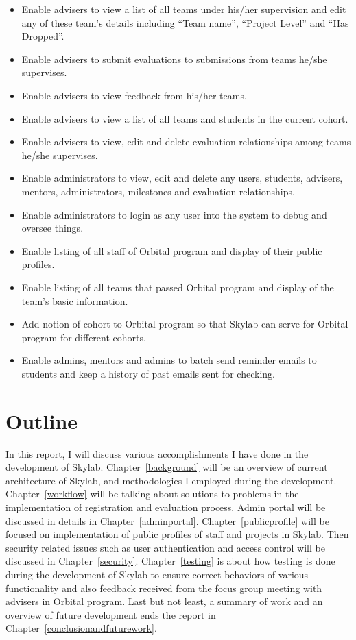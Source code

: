 \begin{itemize}
  \item Enable advisers to view a list of all teams under his/her supervision and edit any of these team's details including ``Team name'', ``Project Level'' and ``Has Dropped''.
  \item Enable advisers to submit evaluations to submissions from teams he/she supervises.
  \item Enable advisers to view feedback from his/her teams.
  \item Enable advisers to view a list of all teams and students in the current cohort.
  \item Enable advisers to view, edit and delete evaluation relationships among teams he/she supervises.
  \item Enable administrators to view, edit and delete any users, students, advisers, mentors, administrators, milestones and evaluation relationships.
  \item Enable administrators to login as any user into the system to debug and oversee things.
  \item Enable listing of all staff of Orbital program and display of their public profiles.
  \item Enable listing of all teams that passed Orbital program and display of the team's basic information.
  \item Add notion of cohort to Orbital program so that Skylab can serve for Orbital program for different cohorts.
  \item Enable admins, mentors and admins to batch send reminder emails to students and keep a history of past emails sent for checking.
\end{itemize}

\section{Outline}

In this report, I will discuss various accomplishments I have done in the development of Skylab. Chapter~\ref{background} will be an overview of current architecture of Skylab, and methodologies I employed during the development. Chapter~\ref{workflow} will be talking about solutions to problems in the implementation of registration and evaluation process. Admin portal will be discussed in details in Chapter~\ref{adminportal}. Chapter~\ref{publicprofile} will be focused on implementation of public profiles of staff and projects in Skylab. Then security related issues such as user authentication and access control will be discussed in Chapter~\ref{security}. Chapter~\ref{testing} is about how testing is done during the development of Skylab to ensure correct behaviors of various functionality and also feedback received from the focus group meeting with advisers in Orbital program. Last but not least, a summary of work and an overview of future development ends the report in Chapter~\ref{conclusionandfuturework}.
